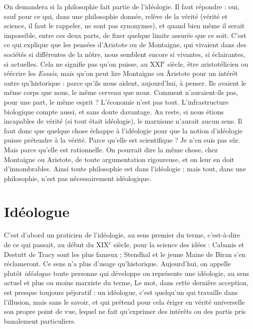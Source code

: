 On demandera si la philosophie fait partie de l'idéologie. Il faut répondre :
oui, sauf pour ce qui, dans une philosophie donnée, relève de la vérité (vérité et
science, il faut le rappeler, ne sont pas synonymes), et quand bien même il
serait impossible, entre ces deux parts, de fixer quelque limite assurée que ce
soit. C’est ce qui explique que les pensées d’Aristote ou de Montaigne, qui
vivaient dans des sociétés si différentes de la nôtre, nous semblent encore si
vivantes, si éclairantes, si actuelles. Cela ne signifie pas qu’on puisse, au
{\footnotesize XXI$^\text{e}$} siècle, être aristotélicien ou réécrire les {\it Essais}, mais qu’on peut lire Montaigne
ou Âristote pour un intérêt autre qu’historique : parce qu'ils nous
aident, aujourd’hui, à penser. Ils avaient le même corps que nous, le même cerveau
que nous. Comment n’auraient-ils pas, pour une part, le même esprit ?
L'économie n’est pas tout. L’infrastructure biologique compte aussi, et sans
doute davantage. Au reste, si nous étions incapables de vérité (si tout était idéologie),
le marxisme n’aurait aucun sens. Il faut donc que quelque chose échappe
à l'idéologie pour que la notion d’idéologie puisse prétendre à la vérité. Parce
qu’elle est scientifique ? Je n’en suis pas sûr. Mais parce qu’elle est rationnelle.
On pourrait dire la même chose, chez Montaigne ou Aristote, de toute argumentation
rigoureuse, et on leur en doit d'innombrables. Ainsi toute philosophie
est dans l'idéologie ; mais tout, dans une philosophie, n’est pas nécessairement
idéologique.

\section{Idéologue}
C'est d’abord un praticien de l’idéologie, au sens premier du
terme, c’est-à-dire de ce qui passait, au début du {\footnotesize XIX$^\text{e}$} siècle,
pour la science des idées : Cabanis et Destutt de Tracy sont les plus fameux ;
Stendhal et le jeune Maine de Biran s’en réclameront. Ce sens n’a plus d’usage
qu’historique. Aujourd’hui, on appelle plutôt {\it idéologue} toute personne qui développe
ou représente une idéologie, au sens actuel et plus ou moins marxiste du
terme, Le mot, dans cette dernière acception, est presque toujours péjoratif : un
idéologue, c’est quelqu'un qui travaille dans l'illusion, mais sans le savoir, et qui
prétend pour cela ériger en vérité universelle son propre point de vue, lequel ne
fait qu’exprimer des intérêts ou des partis pris banalement particuliers.


